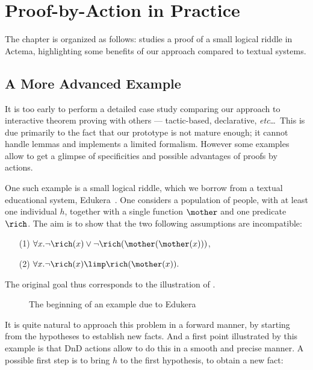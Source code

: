 \setchapterpreamble[u]{\margintoc}
\chapter{Proof-by-Action in Practice}

The chapter is organized as follows:  studies a proof of a small
logical riddle in Actema, highlighting some benefits of our approach compared to
textual systems.

\section{A More Advanced Example}

It is too early to perform a detailed case study comparing our approach
to interactive theorem proving with others --- tactic-based,
declarative, {\em etc}\dots~This is due primarily to the fact that
our prototype is not mature enough; it cannot handle lemmas and
implements a limited formalism. However some examples allow to get a
glimpse of specificities and possible advantages of proofs by actions.

One such example is a small logical riddle, which we borrow from a
textual educational system, Edukera~. One considers a
population of people, with at least one individual $h$, together with a
single function $\mother$ and one predicate $\rich$. The aim is to
show that the two following assumptions are incompatible:
\begin{itemize}
\item[(1)] $\forall x. \neg\rich(x)\lor \neg\rich(\mother(\mother(x)))$,
\item[(2)] $\forall x. \neg\rich(x) \limp \rich(\mother(x)).$
\end{itemize}
The original goal thus corresponds to the illustration of .

\begin{figure*}
  \caption{The beginning of an example due to Edukera}
\end{figure*}

It is quite natural to approach this problem in a forward manner, by starting
from the hypotheses to establish new facts. And a first point illustrated by
this example is that DnD actions allow to do this in a smooth and precise
manner. A possible first step is to bring $h$ to the first hypothesis, to obtain
a new fact:

